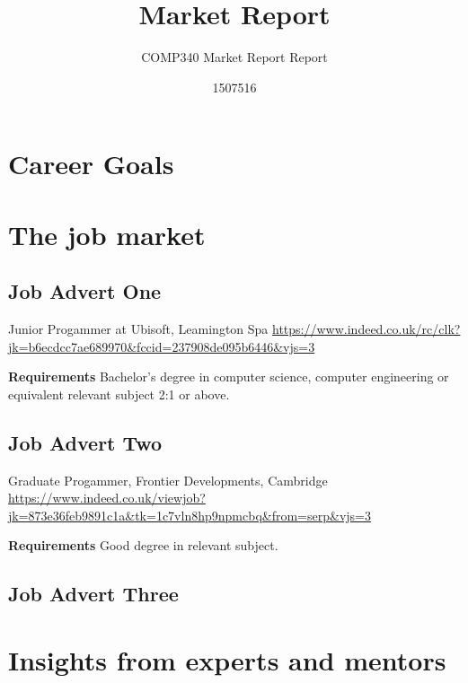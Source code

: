 \documentclass{scrartcl}
\title{Market Report}
\subtitle{COMP340 Market Report Report}
\author{1507516}
\begin{document}
\maketitle


\section{Career Goals}


\section{The job market}

\subsection{Job Advert One}
Junior Progammer at Ubisoft, Leamington Spa
\url{https://www.indeed.co.uk/rc/clk?jk=b6ecdcc7ae689970&fccid=237908de095b6446&vjs=3}

\textbf{Requirements}
Bachelor's degree in computer science, computer engineering or equivalent relevant subject 2:1 or above.

\subsection{Job Advert Two}
Graduate Progammer, Frontier Developments, Cambridge
\url{https://www.indeed.co.uk/viewjob?jk=873e36feb9891c1a&tk=1c7vln8hp9npmcbq&from=serp&vjs=3}

\textbf{Requirements}
Good degree in relevant subject.

\subsection{Job Advert Three}


\section{Insights from experts and mentors}
\end{document}
